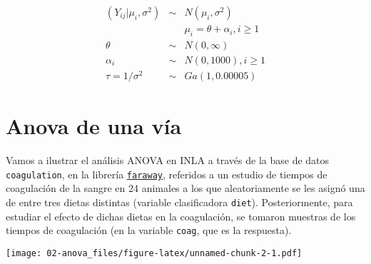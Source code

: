 \documentclass[
]{book}
\newenvironment{Shaded}{\begin{snugshade}}{\end{snugshade}}
\newcommand{\AttributeTok}[1]{\textcolor[rgb]{0.77,0.63,0.00}{#1}}
\newcommand{\CommentTok}[1]{\textcolor[rgb]{0.56,0.35,0.01}{\textit{#1}}}
\newcommand{\FunctionTok}[1]{\textcolor[rgb]{0.00,0.00,0.00}{#1}}
\newcommand{\NormalTok}[1]{#1}
\newcommand{\SpecialCharTok}[1]{\textcolor[rgb]{0.00,0.00,0.00}{#1}}
\newcommand{\StringTok}[1]{\textcolor[rgb]{0.31,0.60,0.02}{#1}}
\begin{document}
\begin{eqnarray*}
(Y_{ij}|\mu_i,\sigma^2) & \sim & N(\mu_i,\sigma^2) \\
&& \mu_i = \theta + \alpha_i, i\geq 1 \\
\theta & \sim & N(0,\infty)\\
\alpha_i & \sim & N(0,1000), i\geq 1\\
\tau=1/\sigma^2 & \sim & Ga(1,0.00005)
\end{eqnarray*}

\hypertarget{anova-de-una-vuxeda}{%
\section{Anova de una vía}\label{anova-de-una-vuxeda}}

Vamos a ilustrar el análisis ANOVA en INLA a través de la base de datos \texttt{coagulation}, en la librería \href{https://cran.r-project.org/web/packages/faraway/faraway.pdf}{\texttt{faraway}}, referidos a un estudio de tiempos de coagulación de la sangre en 24 animales a los que aleatoriamente se les asignó una de entre tres dietas distintas (variable clasificadora \texttt{diet}). Posteriormente, para estudiar el efecto de dichas dietas en la coagulación, se tomaron muestras de los tiempos de coagulación (en la variable \texttt{coag}, que es la respuesta).

\begin{Shaded}
\end{Shaded}

\texttt{[image: 02-anova\_files/figure-latex/unnamed-chunk-2-1.pdf]}
\end{document}
